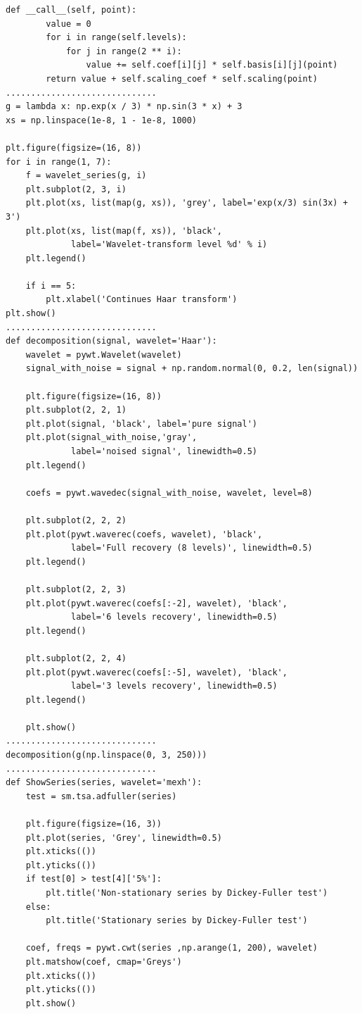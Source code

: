 \documentclass[a4paper]{article}
\begin{document}
\begin{lstlisting}[inputencoding={utf8}]
    def __call__(self, point):
        value = 0
        for i in range(self.levels):
            for j in range(2 ** i):
                value += self.coef[i][j] * self.basis[i][j](point)
        return value + self.scaling_coef * self.scaling(point)
..............................
g = lambda x: np.exp(x / 3) * np.sin(3 * x) + 3
xs = np.linspace(1e-8, 1 - 1e-8, 1000)

plt.figure(figsize=(16, 8))
for i in range(1, 7):
    f = wavelet_series(g, i)
    plt.subplot(2, 3, i)
    plt.plot(xs, list(map(g, xs)), 'grey', label='exp(x/3) sin(3x) + 3')
    plt.plot(xs, list(map(f, xs)), 'black',
             label='Wavelet-transform level %d' % i)
    plt.legend()

    if i == 5:
        plt.xlabel('Continues Haar transform')
plt.show()
..............................
def decomposition(signal, wavelet='Haar'):
    wavelet = pywt.Wavelet(wavelet)
    signal_with_noise = signal + np.random.normal(0, 0.2, len(signal))

    plt.figure(figsize=(16, 8))
    plt.subplot(2, 2, 1)
    plt.plot(signal, 'black', label='pure signal')
    plt.plot(signal_with_noise,'gray', 
             label='noised signal', linewidth=0.5)
    plt.legend()

    coefs = pywt.wavedec(signal_with_noise, wavelet, level=8)

    plt.subplot(2, 2, 2)
    plt.plot(pywt.waverec(coefs, wavelet), 'black',     
             label='Full recovery (8 levels)', linewidth=0.5)
    plt.legend()

    plt.subplot(2, 2, 3)
    plt.plot(pywt.waverec(coefs[:-2], wavelet), 'black', 
             label='6 levels recovery', linewidth=0.5)
    plt.legend()

    plt.subplot(2, 2, 4)
    plt.plot(pywt.waverec(coefs[:-5], wavelet), 'black', 
             label='3 levels recovery', linewidth=0.5)
    plt.legend()

    plt.show()
..............................
decomposition(g(np.linspace(0, 3, 250)))
..............................
def ShowSeries(series, wavelet='mexh'):
    test = sm.tsa.adfuller(series)

    plt.figure(figsize=(16, 3))
    plt.plot(series, 'Grey', linewidth=0.5)
    plt.xticks(())
    plt.yticks(())
    if test[0] > test[4]['5%']: 
        plt.title('Non-stationary series by Dickey-Fuller test')
    else:
        plt.title('Stationary series by Dickey-Fuller test')

    coef, freqs = pywt.cwt(series ,np.arange(1, 200), wavelet)
    plt.matshow(coef, cmap='Greys')
    plt.xticks(())
    plt.yticks(())
    plt.show()


\end{lstlisting}
\end{document}
